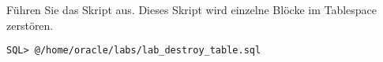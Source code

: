     \item Führen Sie das Skript  aus. Dieses Skript wird einzelne Blöcke im Tablespace  zerstören.
      \begin{lstlisting}[language=terminal]
SQL> @/home/oracle/labs/lab_destroy_table.sql
      \end{lstlisting}
